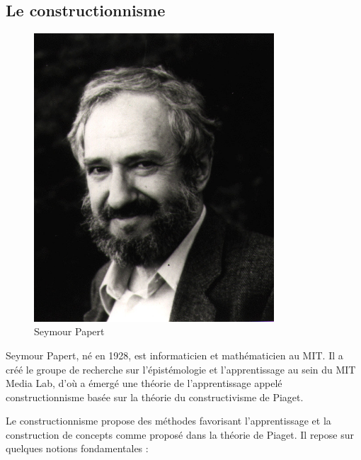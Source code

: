 \subsection{Le constructionnisme}
\begin{minipage}[H]{0.3\linewidth}
  \begin{figure}[H]
  \centering
  \includegraphics[width=0.8\textwidth]{../resources/illustrations/papert}
  \caption{Seymour Papert}
  \end{figure}
\end{minipage}
\begin{minipage}[H]{0.7\linewidth}
Seymour Papert, né en 1928, est informaticien et mathématicien au MIT. Il a créé le groupe de recherche sur l'épistémologie et l'apprentissage au sein du MIT Media Lab, d'où a émergé une théorie de l'apprentissage appelé constructionnisme basée sur la théorie du constructivisme de Piaget\cite{wikipedia_papert}.
\vspace{1cm}
\end{minipage}

Le constructionnisme propose des méthodes favorisant l'apprentissage et la construction de concepts comme proposé dans la théorie de Piaget. Il repose sur quelques notions fondamentales :

